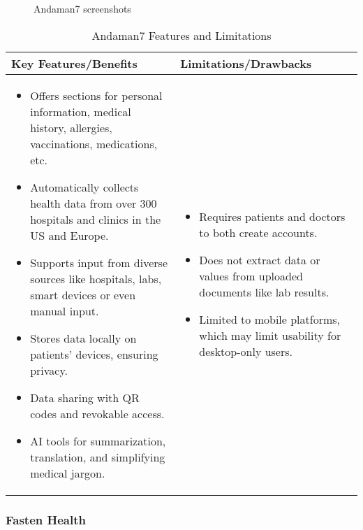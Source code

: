 \begin{figure}[ht]
    \centering
     \quad
    \caption{Andaman7 screenshots}\label{fig:andaman7}
\end{figure}

\begin{table}[htbp]
\centering
    \begin{tabular}{|p{}|p{}|}
    \hline
    \textbf{Key Features/Benefits} & \textbf{Limitations/Drawbacks} \\ \hline
    \begin{itemize}
        \item Offers sections for personal information, medical history, allergies, vaccinations, medications, etc.
        \item Automatically collects health data from over 300 hospitals and clinics in the US and Europe.
        \item Supports input from diverse sources like hospitals, labs, smart devices or even manual input.
        \item Stores data locally on patients’ devices, ensuring privacy.
        \item Data sharing with QR codes and revokable access.
        \item AI tools for summarization, translation, and simplifying medical jargon.
    \end{itemize} &
    \begin{itemize}
        \item Requires patients and doctors to both create accounts.
        \item Does not extract data or values from uploaded documents like lab results.
        \item Limited to mobile platforms, which may limit usability for desktop-only users.
    \end{itemize} \\ \hline
    \end{tabular}
\caption{Andaman7 Features and Limitations}\label{tab:andaman7}
\end{table}

\FloatBarrier{}

\subsubsection{Fasten Health}


